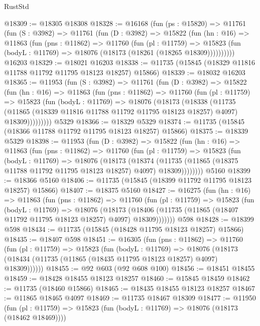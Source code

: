 \begin{lexlean}{RustStd}
\begin{coremodule}
@18309 := @18305 @18308
@18328 := @16168
    (fun (ps : @15820) =>
    @11761
      (fun (S : @3982) =>
      @11761
        (fun (D : @3982) =>
        @15822
          (fun (hn : @16) =>
          @11863
            (fun (pns : @11862) =>
            @11760
              (fun (pl : @11759) =>
              @15823 (fun (bodyL : @11769) => @18076 (@18173 (@18261 (@18265 @18309))))))))))
    @16203
@18329 := @18021 @16203
@18338 := @11735 (@15845 (@18329 @11816 @11788 @11792 @11795 @18123 @18257) @15866)
@18339 := @18032 @16203
@18365 := @11953
    (fun (S : @3982) =>
    @11761
      (fun (D : @3982) =>
      @15822
        (fun (hn : @16) =>
        @11863
          (fun (pns : @11862) =>
          @11760
            (fun (pl : @11759) =>
            @15823
              (fun (bodyL : @11769) =>
              @18076
                (@18173
                  (@18338
                    (@11735
                      (@11865 (@18339 @11816 @11788 @11792 @11795 @18123 @18257) @4097)
                      @18309)))))))))
    @5329
@18366 := @18329 @5329
@18374 := @11735 (@15845 (@18366 @11788 @11792 @11795 @18123 @18257) @15866)
@18375 := @18339 @5329
@18398 := @11953
    (fun (D : @3982) =>
    @15822
      (fun (hn : @16) =>
      @11863
        (fun (pns : @11862) =>
        @11760
          (fun (pl : @11759) =>
          @15823
            (fun (bodyL : @11769) =>
            @18076
              (@18173
                (@18374
                  (@11735 (@11865 (@18375 @11788 @11792 @11795 @18123 @18257) @4097) @18309))))))))
    @5160
@18399 := @18366 @5160
@18406 := @11735 (@15845 (@18399 @11792 @11795 @18123 @18257) @15866)
@18407 := @18375 @5160
@18427 := @16275
    (fun (hn : @16) =>
    @11863
      (fun (pns : @11862) =>
      @11760
        (fun (pl : @11759) =>
        @15823
          (fun (bodyL : @11769) =>
          @18076
            (@18173
              (@18406 (@11735 (@11865 (@18407 @11792 @11795 @18123 @18257) @4097) @18309)))))))
    @598
@18428 := @18399 @598
@18434 := @11735 (@15845 (@18428 @11795 @18123 @18257) @15866)
@18435 := @18407 @598
@18451 := @16305
    (fun (pns : @11862) =>
    @11760
      (fun (pl : @11759) =>
      @15823
        (fun (bodyL : @11769) =>
        @18076 (@18173 (@18434 (@11735 (@11865 (@18435 @11795 @18123 @18257) @4097) @18309))))))
@18455 := @92 @603 (@92 @608 @100)
@18456 := @18451 @18455
@18459 := @18428 @18455 @18123 @18257
@18460 := @15845 @18459
@18462 := @11735 (@18460 @15866)
@18465 := @18435 @18455 @18123 @18257
@18467 := @11865 @18465 @4097
@18469 := @11735 @18467 @18309
@18477 := @11950
    (fun (pl : @11759) => @15823 (fun (bodyL : @11769) => @18076 (@18173 (@18462 @18469))))

\end{coremodule}
\end{lexlean}
